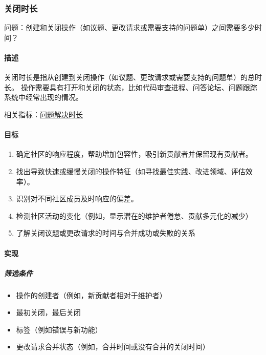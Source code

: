 \hypertarget{ux5173ux95edux65f6ux957f}{%
\subsubsection{关闭时长}\label{ux5173ux95edux65f6ux957f}}

问题：创建和关闭操作（如议题、更改请求或需要支持的问题单）之间需要多少时间？

\hypertarget{ux63cfux8ff0}{%
\paragraph{描述}\label{ux63cfux8ff0}}

关闭时长是指从创建到关闭操作（如议题、更改请求或需要支持的问题单）的总时长。
操作需要具有打开和关闭的状态，比如代码审查进程、问答论坛、问题跟踪系统中经常出现的情况。

相关指标：\href{https://chaoss.community/metric-issue-resolution-duration/}{问题解决时长}

\hypertarget{ux76eeux6807}{%
\paragraph{目标}\label{ux76eeux6807}}

\begin{enumerate}
\def\labelenumi{\arabic{enumi}.}
\tightlist
\item
  确定社区的响应程度，帮助增加包容性，吸引新贡献者并保留现有贡献者。
\item
  找出导致快速或缓慢关闭的操作特征（如寻找最佳实践、改进领域、评估效率）。
\item
  识别对不同社区成员及时响应的偏差。
\item
  检测社区活动的变化（例如，显示潜在的维护者倦怠、贡献多元化的减少）
\item
  了解关闭议题或更改请求的时间与合并成功或失败的关系
\end{enumerate}

\hypertarget{ux5b9eux73b0}{%
\paragraph{实现}\label{ux5b9eux73b0}}

\hypertarget{ux7b5bux9009ux6761ux4ef6}{%
\subparagraph{筛选条件}\label{ux7b5bux9009ux6761ux4ef6}}

\begin{itemize}
\tightlist
\item
  操作的创建者（例如，新贡献者相对于维护者）
\item
  最初关闭，最后关闭
\item
  标签（例如错误与新功能）
\item
  更改请求合并状态（例如，合并时间或没有合并的关闭时间）
\end{itemize}

